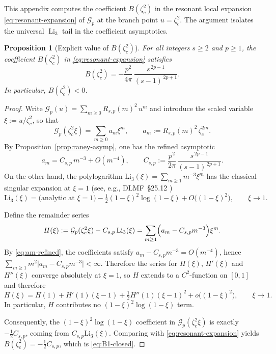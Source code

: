 \documentclass[11pt]{amsart}
\numberwithin{equation}{section}
\theoremstyle{plain}
\newtheorem{proposition}[theorem]{Proposition}
\theoremstyle{definition}
\theoremstyle{remark}
\begin{document}
This appendix computes the coefficient $B(\zeta_c^2)$ in the resonant local
expansion \eqref{eq:resonant-expansion} of $\mathcal G_p$ at the branch point
$u=\zeta_c^2$. The argument isolates the universal $\operatorname{Li}_3$ tail
in the coefficient asymptotics.

\begin{proposition}[Explicit value of $B(\zeta_c^2)$]\label{prop:B1-closed}
	For all integers $s\ge2$ and $p\ge1$, the coefficient $B(\zeta_c^2)$ in
	\eqref{eq:resonant-expansion} satisfies
	\begin{equation}\label{eq:B1-closed}
		B(\zeta_c^2)
		=
		-\frac{p^{2}}{4\pi}\,
		\frac{s^{\,2p-1}}{(s-1)^{\,2p+1}}.
	\end{equation}
	In particular, $B(\zeta_c^2)<0$.
\end{proposition}

\begin{proof}
	Write $\mathcal G_p(u)=\sum_{m\ge0}R_{s,p}(m)^2\,u^m$ and introduce the scaled variable
	$\xi:=u/\zeta_c^2$, so that
	\[
		\mathcal G_p(\zeta_c^2 \xi)=\sum_{m\ge0}a_m \xi^m,
		\qquad
		a_m:=R_{s,p}(m)^2\,\zeta_c^{2m}.
	\]
	By Proposition~\ref{prop:raney-asymp}, one has the refined asymptotic
	\begin{equation}\label{eq:am-refined}
		a_m = C_{s,p}\,m^{-3}+O(m^{-4}),
		\qquad
		C_{s,p}:=\frac{p^{2}}{2\pi}\,\frac{s^{\,2p-1}}{(s-1)^{\,2p+1}}.
	\end{equation}
	On the other hand, the polylogarithm $\mathrm{Li}_3(\xi)=\sum_{m\ge1}m^{-3}\xi^m$
	has the classical singular expansion at $\xi=1$ (see, e.g., DLMF~\S25.12
	\cite{NIST:DLMF})
	\[
		\mathrm{Li}_3(\xi)
		= \text{(analytic at $\xi=1$)} - \tfrac12(1-\xi)^2\log(1-\xi) + O\!\bigl((1-\xi)^2\bigr),
		\qquad \xi\to1.
	\]

	Define the remainder series
	\[
		H(\xi):=\mathcal G_p(\zeta_c^2\xi)-C_{s,p}\,\mathrm{Li}_3(\xi)
		=\sum_{m\ge1}\Bigl(a_m-C_{s,p}m^{-3}\Bigr)\xi^m.
	\]
	By \eqref{eq:am-refined}, the coefficients satisfy $a_m-C_{s,p}m^{-3}=O(m^{-4})$,
	hence $\sum_{m\ge1}m^2\bigl|a_m-C_{s,p}m^{-3}\bigr|<\infty$. Therefore the series for
	$H(\xi)$, $H'(\xi)$ and $H''(\xi)$ converge absolutely at $\xi=1$, so $H$ extends to a
	$C^2$-function on $[0,1]$ and therefore
	\[
		H(\xi)=H(1)+H'(1)(\xi-1)+\tfrac12H''(1)(\xi-1)^2+o\bigl((1-\xi)^2\bigr),
		\qquad \xi\to1.
	\]
	In particular, $H$ contributes no $(1-\xi)^2\log(1-\xi)$ term.

	Consequently, the $(1-\xi)^2\log(1-\xi)$ coefficient in $\mathcal G_p(\zeta_c^2\xi)$ is exactly
	$-\tfrac12C_{s,p}$, coming from $C_{s,p}\mathrm{Li}_3(\xi)$. Comparing with
	\eqref{eq:resonant-expansion} yields $B(\zeta_c^2)=-\tfrac12C_{s,p}$, which is
	\eqref{eq:B1-closed}.
\end{proof}
\end{document}
